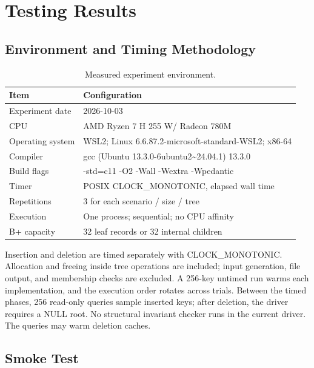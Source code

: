 \section{Testing Results}

\subsection{Environment and Timing Methodology}

\begin{table}[H]
\centering
\small
\caption{Measured experiment environment.}
\begin{tabularx}{\textwidth}{lX}
\toprule
Item & Configuration \\
\midrule
Experiment date & 2026-10-03 \\
CPU & AMD Ryzen 7 H 255 W/ Radeon 780M \\
Operating system & WSL2; Linux 6.6.87.2-microsoft-standard-WSL2; x86-64 \\
Compiler & gcc (Ubuntu 13.3.0-6ubuntu2\textasciitilde{}24.04.1) 13.3.0 \\
Build flags & -std=c11 -O2 -Wall -Wextra -Wpedantic \\
Timer & POSIX CLOCK\_MONOTONIC, elapsed wall time \\
Repetitions & 3 for each scenario / size / tree \\
Execution & One process; sequential; no CPU affinity \\
B+ capacity & 32 leaf records or 32 internal children \\
\bottomrule
\end{tabularx}
\end{table}
\FloatBarrier

Insertion and deletion are timed separately with CLOCK\_\allowbreak{}MONOTONIC. Allocation and freeing inside tree operations are included; input generation, file output, and membership checks are excluded. A 256-key untimed run warms each implementation, and the execution order rotates across trials. Between the timed phases, 256 read-only queries sample inserted keys; after deletion, the driver requires a NULL root. No structural invariant checker runs in the current driver. The queries may warm deletion caches.

\subsection{Smoke Test}

